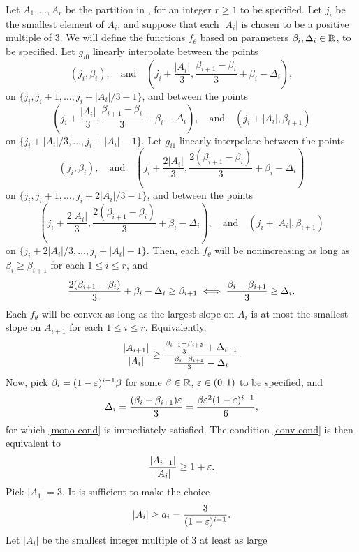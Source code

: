 Let $A_1, \dots, A_r$ be the partition in , for an
integer $r \ge 1$ to be specified. Let $j_i$ be the smallest element
of $A_i$, and suppose that each $|A_i|$ is chosen to be a positive
multiple of $3$. We will define the functions $f_\theta$ based on
parameters $\beta_i, \Delta_i \in \mathbb{R}$, to be specified. Let $g_{i0}$
linearly interpolate between the points
\[
  (j_i, \beta_i), \quad \text{and} \quad \left(j_i + \frac{|A_i|}{3}, \frac{\beta_{i + 1} - \beta_i}{3} + \beta_i - \Delta_i \right) ,
\]
on $\{j_i, j_i + 1, \dots, j_i + |A_i|/3 - 1\}$,
and between the points
\[
  \left( j_i + \frac{|A_i|}{3}, \frac{\beta_{i + 1} - \beta_i}{3} + \beta_i - \Delta_i \right), \quad \text{and} \quad (j_i + |A_i|, \beta_{i + 1}) 
\]
on $\{j_i + |A_i|/3, \dots, j_i + |A_i| - 1\}$. Let $g_{i1}$ linearly
interpolate between the points
\[
  (j_i, \beta_i), \quad \text{and} \quad \left(j_i + \frac{2 |A_i|}{3}, \frac{2 (\beta_{i + 1} - \beta_i)}{3} + \beta_i - \Delta_i \right)
\]
on $\{j_i, j_i + 1, \dots, j_i + 2|A_i|/3 - 1\}$, and
between the points
\[
  \left(j_i + \frac{2|A_i|}{3}, \frac{2 (\beta_{i + 1} - \beta_i)}{3} + \beta_i - \Delta_i \right), \quad \text{and} \quad (j_i + |A_i|, \beta_{i + 1})
\]
on $\{j_i + 2|A_i|/3, \dots, j_i + |A_i| - 1\}$.  Then, each
$f_\theta$ will be nonincreasing as long as
$\beta_i \ge \beta_{i + 1}$ for each $1 \le i \le r$, and
\begin{equation}
  \frac{2 (\beta_{i + 1} - \beta_i)}{3} + \beta_i - \Delta_i \ge \beta_{i + 1} \iff \frac{\beta_i - \beta_{i + 1}}{3} \ge \Delta_i . \eqlabel{mono-cond}
\end{equation}
Each $f_\theta$ will be convex as long as the largest slope on $A_i$
is at most the smallest slope on $A_{i + 1}$ for each $1 \le i \le
r$. Equivalently,
\begin{equation}
  \frac{|A_{i + 1}|}{|A_i|} \ge \frac{ \frac{\beta_{i + 1} - \beta_{i + 2}}{3} + \Delta_{i + 1}}{\frac{\beta_i - \beta_{i + 1}}{3} - \Delta_i} . \eqlabel{conv-cond}
\end{equation}
Now, pick $\beta_i = (1 - \varepsilon)^{i - 1} \beta$ for some
$\beta \in \mathbb{R}$, $\varepsilon \in (0, 1)$ to be specified, and
\[
  \Delta_i = \frac{(\beta_i - \beta_{i + 1}) \varepsilon }{3} = \frac{ \beta \varepsilon^2 (1 - \varepsilon)^{i - 1}}{6} ,
\]
for which \eqref{mono-cond} is immediately satisfied. The condition
\eqref{conv-cond} is then equivalent to
\[
  \frac{|A_{i + 1}|}{|A_i|} \ge 1 + \varepsilon .
\]
Pick $|A_1| = 3$. It is sufficient to make the choice
\[
  |A_i| \ge a_i = \frac{3}{(1 - \varepsilon)^{i - 1}} .
\]
Let $|A_i|$ be the smallest integer multiple of $3$ at least as large

